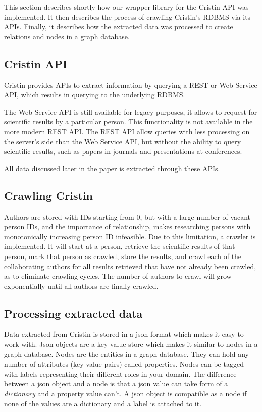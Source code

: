 This section describes shortly how our wrapper library for the Cristin API was implemented. It then describes the process of crawling Cristin's RDBMS via its APIs. Finally, it describes how the extracted data was processed to create relations and nodes in a graph database.

\subsection*{Cristin API}
Cristin provides APIs to extract information by querying a REST or Web Service API, which results in querying to the underlying RDBMS.


The Web Service API\cite{CRISTIN-WS} is still available for legacy purposes, it allows to request for scientific results by a particular person. This functionality is not available in the more modern REST API. The REST API\cite{CRISTIN-REST} allow queries with less processing on the server's side than the Web Service API, but without the ability to query scientific results, such as papers in journals and presentations at conferences.

All data discussed later in the paper is extracted through these APIs.

\subsection*{Crawling Cristin}
Authors are stored with IDs starting from 0, but with a large number of vacant person IDs, and the importance of relationship, makes researching persons with monotonically increasing person ID infeasible.
Due to this limitation, a crawler is implemented. It will start at a person, retrieve the scientific results of that person, mark that person as crawled, store the results, and crawl each of the collaborating authors for all results retrieved that have not already been crawled, as to eliminate crawling cycles.
The number of authors to crawl will grow exponentially until all authors are finally crawled.

\subsection*{Processing extracted data}
Data extracted from Cristin is stored in a json format which makes it easy to work with. Json objects are a key-value store which makes it similar to nodes in a graph database. Nodes are the entities in a graph database. They can hold any number of attributes (key-value-pairs) called properties. Nodes can be tagged with labels representing their different roles in your domain.\cite{neo4j} The difference between a json object and a node is that a json value can take form of a \textit{dictionary} and a property value can't. A json object is compatible as a node if none of the values are a dictionary and a label is attached to it.

